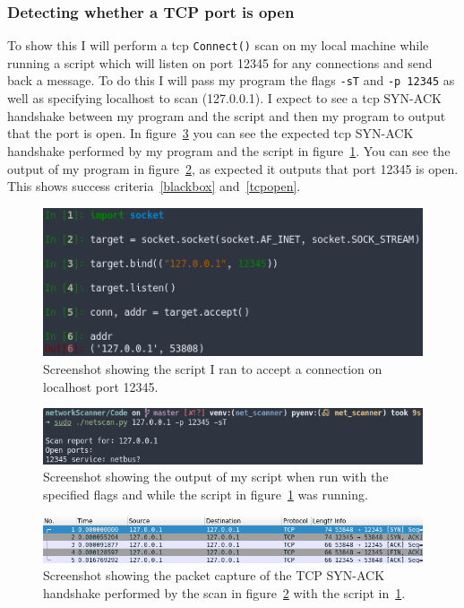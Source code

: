 \documentclass[titlepage]{article}
\let\Oldsubsubsection\subsubsection{}
\renewcommand{\subsubsection}{\FloatBarrier\Oldsubsubsection}
\begin{document}
\subsubsection{Detecting whether a TCP port is open}
To show this I will perform a \gls{tcp} \verb|Connect()| scan on my local
machine while running a script which will listen on port 12345 for any connections
and send back a message. To do this I will pass my program the flags \verb|-sT| and
\verb|-p 12345| as well as specifying localhost to scan (127.0.0.1).
I expect to see a \gls{tcp} SYN-ACK handshake between my program and the script and
then my program to output that the port is open. In figure~\ref{tcpopenpcap} you can
see the expected \gls{tcp} SYN-ACK handshake performed by my program and the script
in figure~\ref{tcpopenscript}.
You can see the output of my program in figure~\ref{tcpopenoutput}, as expected
it outputs that port 12345 is open. This shows success criteria~\ref{blackbox}
and~\ref{tcpopen}.

\begin{figure}[H]
  \centering
  \includegraphics[width=\textwidth]{screenshots/tcpopenscript.png}
  \caption{%
    Screenshot showing the script I ran to accept a connection on localhost port 12345.
  }\label{tcpopenscript}
\end{figure}

\begin{figure}[H]
  \centering
  \includegraphics[width=\textwidth]{screenshots/tcpopenoutput.png}
  \caption{%
    Screenshot showing the output of my script when run with the specified flags
    and while the script in figure~\ref{tcpopenscript} was running.
  }\label{tcpopenoutput}
\end{figure}

\begin{figure}[H]
  \centering
  \includegraphics[width=\textwidth]{screenshots/tcpopenpcap.png}
  \caption{%
    Screenshot showing the packet capture of the TCP SYN-ACK handshake performed
    by the scan in figure~\ref{tcpopenoutput} with the script in~\ref{tcpopenscript}.
  }\label{tcpopenpcap}
\end{figure}
\end{document}
